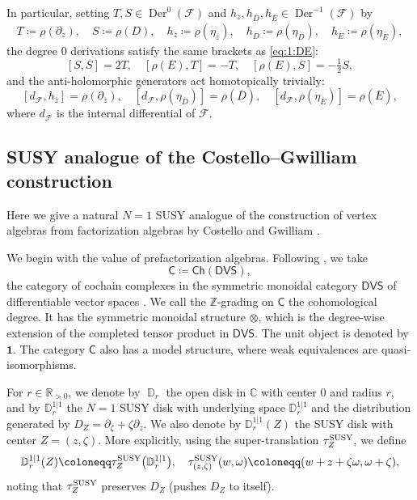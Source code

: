 \documentclass[final,reqno]{amsart}
\numberwithin{equation}{section}
\theoremstyle{definition}
\newcommand{\ol}{\overline}
\newcommand{\ceq}{\coloneqq} %
\newcommand{\SUSY}{\textup{SUSY}}
\newcommand{\bbC}{\mathbb{C}}
\newcommand{\bbR}{\mathbb{R}}
\newcommand{\bbZ}{\mathbb{Z}}
\newcommand{\sD}{\mathbb{D}^{1|1}}
\newcommand{\clF}{\mathcal{F}}
\newcommand{\sfC}{\mathsf{C}}
\newcommand{\Ch}{\mathsf{Ch}}
\newcommand{\DVS}{\mathsf{DVS}}
\newcommand{\pd}{\partial}
\DeclareMathOperator{\bbD}{\mathbb{D}}
\DeclareMathOperator{\Der}{Der}
\begin{document}
In particular, setting $T,S\in\Der^0(\clF)$ and 
$h_{\ol{z}},h_{\ol{D}},h_{\ol{E}}\in\Der^{-1}(\clF)$ by 
\begin{align}\label{eq:1:TS}
 T \ceq \rho(\pd_z), \quad 
 S \ceq \rho(D), \quad 
 h_{\ol{z}} \ceq \rho(\eta_{\ol{z}}), \quad 
 h_{\ol{D}} \ceq \rho(\eta_{\ol{D}}), \quad 
 h_{\ol{E}} \ceq \rho(\eta_{\ol{E}}),
\end{align}
the degree 0 derivations satisfy the same brackets as \eqref{eq:1:DE}: 
\[
 [S      ,S]=2T, \quad 
 [\rho(E),T]=-T, \quad 
 [\rho(E),S]=-\tfrac{1}{2}S, 
\]
and the anti-holomorphic generators act homotopically trivially:
\[
 [d_{\clF},h_{\ol{z}}]=\rho(\pd_{\ol{z}}),\quad
 [d_{\clF},\rho(\eta_{\ol{D}})]=\rho(\ol{D}),\quad
 [d_{\clF},\rho(\eta_{\ol{E}})]=\rho(\ol{E}),
\]
where $d_{\clF}$ is the internal differential of $\clF$.

\subsection{SUSY analogue of the Costello--Gwilliam construction}
\label{ss:1.4}

Here we give a natural $N=1$ SUSY analogue of the construction of vertex algebras
from factorization algebras by Costello and Gwilliam \cite[Theorem 5.3.3]{CG1}.

We begin with the value of prefactorization algebras.
Following \cite{CG1}, we take
\[
 \sfC \ceq \Ch(\DVS),
\]
the category of cochain complexes in the symmetric monoidal category $\DVS$ of
differentiable vector spaces \cite[Appendix B]{CG1}.
We call the $\bbZ$-grading on $\sfC$ the cohomological degree.
It has the symmetric monoidal structure $\otimes$, 
which is the degree-wise extension of the completed tensor product in $\DVS$.
The unit object is denoted by $\bm{1}$.
The category $\sfC$ also has a model structure, 
where weak equivalences are quasi-isomorphisms.

For $r \in \bbR_{>0}$, we denote by $\bbD_r$ 
the open disk in $\bbC$ with center $0$ and radius $r$,
and by $\sD_r$ the $N=1$ SUSY disk with underlying space $\sD_r$
and the distribution generated by $D_Z=\pd_\zeta+\zeta\pd_z$.
We also denote by $\sD_r(Z)$ the SUSY disk with center $Z=(z,\zeta)$.
More explicitly, using the super-translation $\tau^{\SUSY}_Z$, we define 
\[
 \sD_r(Z) \ceq \tau^{\SUSY}_{Z}\bigl(\sD_r\bigr), \quad 
 \tau^{\SUSY}_{(z,\zeta)}(w,\omega) \ceq (w+z+\zeta\omega,\omega+\zeta),
\]
noting that $\tau^{\SUSY}_Z$ preserves $D_Z$ (pushes $D_Z$ to itself).
\end{document}
